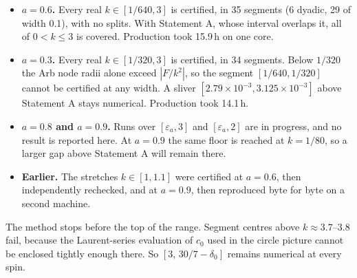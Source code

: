 \documentclass[11pt,a4paper]{article}
\begin{document}
\begin{itemize}
\item \textbf{$a=0.6$.} Every real $k\in[1/640,3]$ is certified, in 35 segments (6 dyadic, 29 of width 0.1), with
no splits. With Statement A, whose interval overlaps it, all of $0<k\le3$ is covered. Production took 15.9\,h on
one core.
\item \textbf{$a=0.3$.} Every real $k\in[1/320,3]$ is certified, in 34 segments. Below $1/320$ the Arb node radii
alone exceed $|F/k^2|$, so the segment $[1/640,1/320]$ cannot be certified at any width. A sliver
$[2.79\times10^{-3},3.125\times10^{-3}]$ above Statement A stays numerical. Production took 14.1\,h.
\item \textbf{$a=0.8$ and $a=0.9$.} Runs over $[\varepsilon_a,3]$ and $[\varepsilon_a,2]$ are in progress, and no
result is reported here. At $a=0.9$ the same floor is reached at $k=1/80$, so a larger gap above Statement A will
remain there.
\item \textbf{Earlier.} The stretches $k\in[1,1.1]$ were certified at $a=0.6$, then independently rechecked, and at
$a=0.9$, then reproduced byte for byte on a second machine.
\end{itemize}
The method stops before the top of the range. Segment centres above $k\approx3.7$--$3.8$ fail, because the
Laurent-series evaluation of $c_0$ used in the circle picture cannot be enclosed tightly enough there. So
$[3,\,30/7-\delta_0]$ remains numerical at every spin.
\end{document}
